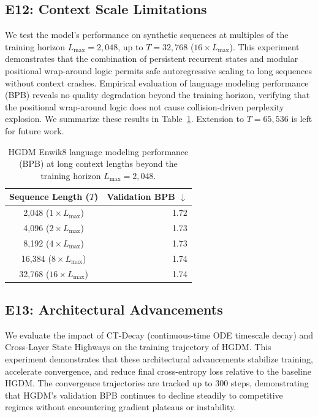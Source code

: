 \documentclass{article}
\begin{document}
\subsection{E12: Context Scale Limitations}
We test the model's performance on synthetic sequences at multiples of the training horizon $L_{\max} = 2{,}048$, up to $T = 32{,}768$ ($16{\times}L_{\max}$). This experiment demonstrates that the combination of persistent recurrent states and modular positional wrap-around logic permits safe autoregressive scaling to long sequences without context crashes. Empirical evaluation of language modeling performance (BPB) reveals no quality degradation beyond the training horizon, verifying that the positional wrap-around logic does not cause collision-driven perplexity explosion. We summarize these results in Table~\ref{tab:wrap_around}. Extension to $T = 65{,}536$ is left for future work.

\begin{table}[!ht]
\centering
\caption{HGDM Enwik8 language modeling performance (BPB) at long context lengths beyond the training horizon $L_{\max} = 2{,}048$.}
\label{tab:wrap_around}
\begin{tabular}{cr}
\toprule
Sequence Length ($T$) & Validation BPB $\downarrow$ \\
\midrule
2{,}048  ($1 \times L_{\max}$) & 1.72 \\
4{,}096  ($2 \times L_{\max}$) & 1.73 \\
8{,}192  ($4 \times L_{\max}$) & 1.73 \\
16{,}384 ($8 \times L_{\max}$) & 1.74 \\
32{,}768 ($16 \times L_{\max}$) & 1.74 \\
\bottomrule
\end{tabular}
\end{table}

\subsection{E13: Architectural Advancements}
\label{sec:e13}
We evaluate the impact of CT-Decay (continuous-time ODE timescale decay) and Cross-Layer State Highways on the training trajectory of HGDM. This experiment demonstrates that these architectural advancements stabilize training, accelerate convergence, and reduce final cross-entropy loss relative to the baseline HGDM. The convergence trajectories are tracked up to 300 steps, demonstrating that HGDM's validation BPB continues to decline steadily to competitive regimes without encountering gradient plateaus or instability.
\end{document}
